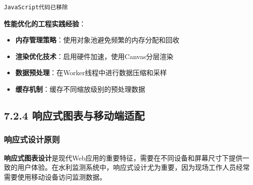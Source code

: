 {{{\begin{lstlisting}
JavaScript代码已移除 \end{lstlisting} \textbf{性能优化的工程实践经验}： \begin{itemize} \tightlist \item
\textbf{内存管理策略}：使用对象池避免频繁的内存分配和回收 \item \textbf{渲染优化技术}：启用硬件加速，使用Canvas分层渲染 \item \textbf{数据预处理}：在Worker线程中进行数据压缩和采样
\item \textbf{缓存机制}：缓存不同缩放级别的预处理数据 \end{itemize} \subsection{7.2.4
响应式图表与移动端适配}\label{ux54cdux5e94ux5f0fux56feux8868ux4e0eux79fbux52a8ux7aefux9002ux914d}
\subsubsection{响应式设计原则}\label{ux54cdux5e94ux5f0fux8bbeux8ba1ux539fux5219}
\textbf{响应式图表设计}是现代Web应用的重要特征，需要在不同设备和屏幕尺寸下提供一致的用户体验。在水利监测系统中，响应式设计尤为重要，因为现场工作人员经常需要使用移动设备访问监测数据。
}}}
